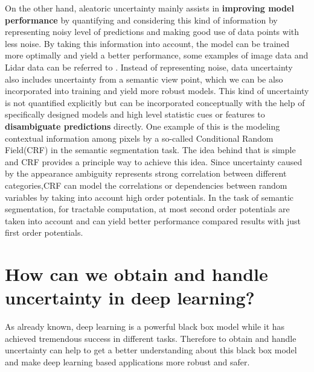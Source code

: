On the other hand, aleatoric uncertainty mainly assists in \textbf{improving model performance} by quantifying and considering this kind of information by representing noisy level of predictions and making good use of data points with less noise. By taking this information into account, the model can be trained more optimally and yield a better performance, some examples of image data and Lidar data can be referred to \cite{kendall2016modelling}\cite{feng2018towards}. Instead of representing noise, data uncertainty also includes uncertainty from a semantic view point, which we can be also incorporated into training and yield more robust models. This kind of uncertainty is not quantified explicitly but can be incorporated conceptually with the help of specifically designed models and high level statistic cues or features to \textbf{disambiguate predictions} directly. One example of this is the modeling contextual information among pixels by a so-called Conditional Random Field(CRF) 
in the semantic segmentation task\cite{krahenbuhl2011efficient}\cite{sutton2012introduction}\cite{lin2016efficient}. The idea behind that is simple and CRF provides a principle way to achieve this idea. Since uncertainty caused by the appearance ambiguity represents strong correlation between different categories,CRF can model the correlations or dependencies between random variables by taking into account high order potentials. In the task of semantic segmentation, for tractable computation, at most second order potentials are taken into account and can yield better performance compared results with just first order potentials. 
\section{How can we obtain and handle uncertainty in deep learning?}
As already known, deep learning is a powerful black box model while it has achieved tremendous success in different tasks. Therefore to obtain and handle uncertainty can help to get a better understanding about this black box model and make deep learning based applications more robust and safer. 

